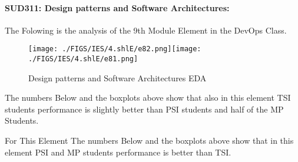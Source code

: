 \documentclass[12pt]{extreport}
\begin{document}

\paragraph{\large SUD311: Design patterns and Software Architectures:\\
}
The Folowing is the analysis of the 9th Module Element in the DevOps Class.  

\begin{figure}[H]
	\centering
	\texttt{[image: ./FIGS/IES/4.shlE/e82.png]}\texttt{[image: ./FIGS/IES/4.shlE/e81.png]}
	\caption{Design patterns and Software Architectures EDA}
	\label{fig:51}
\end{figure}

The numbers Below and the boxplots above show that also in this element  TSI students performance is slightly better than PSI students and half of the MP Students.

For This Element The numbers Below and the boxplots above show that in this element  PSI and MP students performance is  better than TSI.
\end{document}
